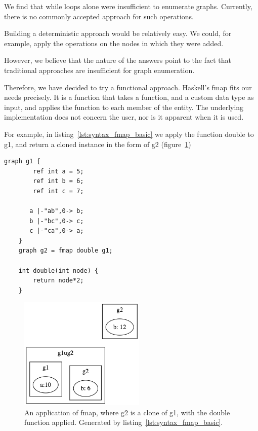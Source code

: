We find that while loops alone were insufficient to enumerate graphs.
Currently, there is no commonly accepted approach
for such operations.

Building a deterministic approach would be relatively easy.
We could, for example, apply the operations on the nodes in which
they were added.

However, we believe that the nature of the answers point to the fact that traditional approaches are insufficient for graph
enumeration.

Therefore, we have decided to try a functional approach.
Haskell's fmap fits our needs precisely.
It is a function that takes a function, and a custom data type as input, and applies the function to each member of
the entity.
The underlying implementation does not concern the user, nor is it apparent when it is used.

For example, in listing~\ref{lst:syntax_fmap_basic} we apply the function double to g1, and return a cloned instance
in the form of g2 (figure~\ref{fig:syntax_fmap_basic})

\begin{lstlisting}[caption={Simple fmap application on a graph.},captionpos=b,label={lst:syntax_fmap_basic}]
    graph g1 {
        ref int a = 5;
        ref int b = 6;
        ref int c = 7;

       a |-"ab",0-> b;
       b |-"bc",0-> c;
       c |-"ca",0-> a;
    }
    graph g2 = fmap double g1;

    int double(int node) {
        return node*2;
    }
\end{lstlisting}

\begin{figure}[H]
    \centering
    \includegraphics[width=6cm]{figures/syntax_section/syntax_ref_vs_clone_graphs}
    \caption{An application of fmap, where g2 is a clone of g1, with the double function applied. Generated by listing~\ref{lst:syntax_fmap_basic}.}
    \label{fig:syntax_fmap_basic}
\end{figure}


